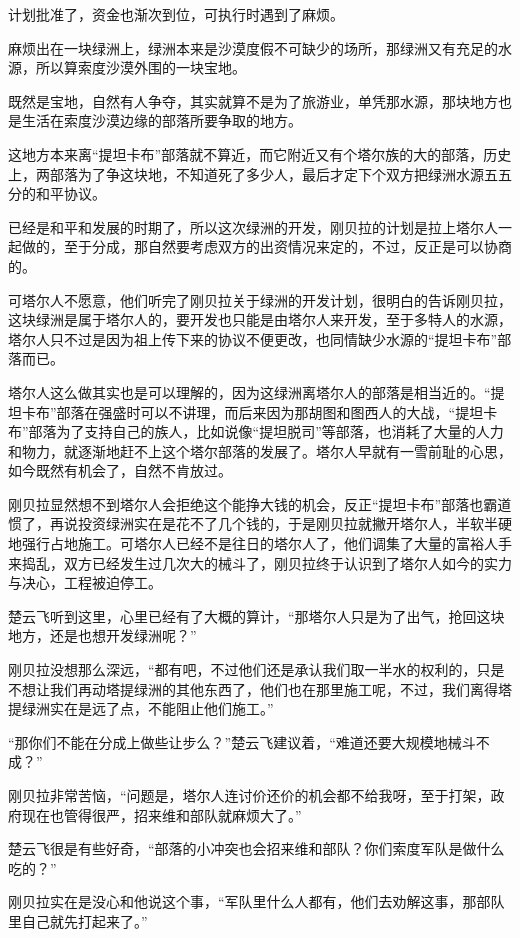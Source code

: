 计划批准了，资金也渐次到位，可执行时遇到了麻烦。

麻烦出在一块绿洲上，绿洲本来是沙漠度假不可缺少的场所，那绿洲又有充足的水源，所以算索度沙漠外围的一块宝地。

既然是宝地，自然有人争夺，其实就算不是为了旅游业，单凭那水源，那块地方也是生活在索度沙漠边缘的部落所要争取的地方。

这地方本来离“提坦卡布”部落就不算近，而它附近又有个塔尔族的大的部落，历史上，两部落为了争这块地，不知道死了多少人，最后才定下个双方把绿洲水源五五分的和平协议。

已经是和平和发展的时期了，所以这次绿洲的开发，刚贝拉的计划是拉上塔尔人一起做的，至于分成，那自然要考虑双方的出资情况来定的，不过，反正是可以协商的。

可塔尔人不愿意，他们听完了刚贝拉关于绿洲的开发计划，很明白的告诉刚贝拉，这块绿洲是属于塔尔人的，要开发也只能是由塔尔人来开发，至于多特人的水源，塔尔人只不过是因为祖上传下来的协议不便更改，也同情缺少水源的“提坦卡布”部落而已。

塔尔人这么做其实也是可以理解的，因为这绿洲离塔尔人的部落是相当近的。“提坦卡布”部落在强盛时可以不讲理，而后来因为那胡图和图西人的大战，“提坦卡布”部落为了支持自己的族人，比如说像“提坦脱司”等部落，也消耗了大量的人力和物力，就逐渐地赶不上这个塔尔部落的发展了。塔尔人早就有一雪前耻的心思，如今既然有机会了，自然不肯放过。

刚贝拉显然想不到塔尔人会拒绝这个能挣大钱的机会，反正“提坦卡布”部落也霸道惯了，再说投资绿洲实在是花不了几个钱的，于是刚贝拉就撇开塔尔人，半软半硬地强行占地施工。可塔尔人已经不是往日的塔尔人了，他们调集了大量的富裕人手来捣乱，双方已经发生过几次大的械斗了，刚贝拉终于认识到了塔尔人如今的实力与决心，工程被迫停工。

楚云飞听到这里，心里已经有了大概的算计，“那塔尔人只是为了出气，抢回这块地方，还是也想开发绿洲呢？”

刚贝拉没想那么深远，“都有吧，不过他们还是承认我们取一半水的权利的，只是不想让我们再动塔提绿洲的其他东西了，他们也在那里施工呢，不过，我们离得塔提绿洲实在是远了点，不能阻止他们施工。”

“那你们不能在分成上做些让步么？”楚云飞建议着，“难道还要大规模地械斗不成？”

刚贝拉非常苦恼，“问题是，塔尔人连讨价还价的机会都不给我呀，至于打架，政府现在也管得很严，招来维和部队就麻烦大了。”

楚云飞很是有些好奇，“部落的小冲突也会招来维和部队？你们索度军队是做什么吃的？”

刚贝拉实在是没心和他说这个事，“军队里什么人都有，他们去劝解这事，那部队里自己就先打起来了。”

